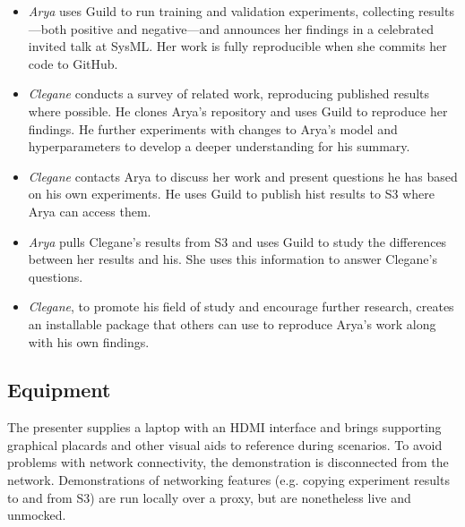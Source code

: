 \documentclass{article}
\begin{document}
\begin{itemize}[topsep=0pt, itemsep=0pt]
\item \emph{Arya} uses Guild to run training and validation
  experiments, collecting results---both positive and negative---and
  announces her findings in a celebrated invited talk at SysML. Her
  work is fully reproducible when she commits her code to GitHub.

\item \emph{Clegane} conducts a survey of related work, reproducing
  published results where possible. He clones Arya's repository and
  uses Guild to reproduce her findings. He further experiments with
  changes to Arya's model and hyperparameters to develop a deeper
  understanding for his summary.

\item \emph{Clegane} contacts Arya to discuss her work and present
  questions he has based on his own experiments. He uses Guild to
  publish hist results to S3 where Arya can access them.

\item \emph{Arya} pulls Clegane's results from S3 and uses Guild to
  study the differences between her results and his. She uses this
  information to answer Clegane's questions.

\item \emph{Clegane}, to promote his field of study and encourage
  further research, creates an installable package that others can use
  to reproduce Arya's work along with his own findings.
\end{itemize}

\subsection{Equipment}

The presenter supplies a laptop with an HDMI interface and brings
supporting graphical placards and other visual aids to reference
during scenarios. To avoid problems with network connectivity, the
demonstration is disconnected from the network. Demonstrations of
networking features (e.g. copying experiment results to and from S3)
are run locally over a proxy, but are nonetheless live and unmocked.



\end{document}
